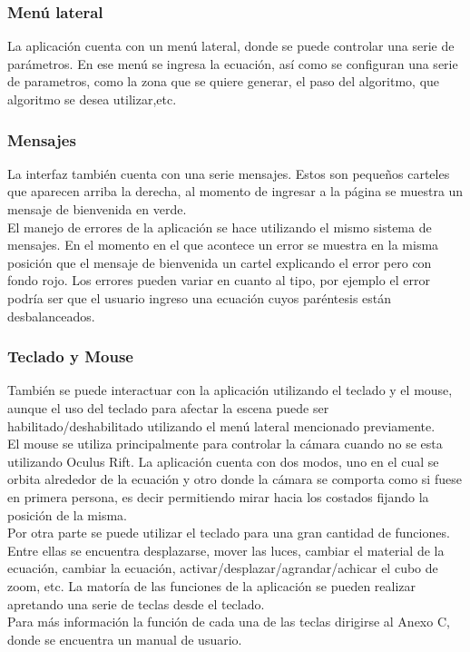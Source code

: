 \documentclass[12pt]{article}
\begin{document}
\subsubsection{Menú lateral}
La aplicación cuenta con un menú lateral, donde se puede controlar una serie de parámetros. En ese menú se ingresa la ecuación, así como se configuran una serie de parametros, como la zona que se quiere generar, el paso del algoritmo, que algoritmo se desea utilizar,etc. 
\subsubsection{Mensajes}
La interfaz también cuenta con una serie mensajes. Estos son pequeños carteles que aparecen arriba la derecha, al momento de ingresar a la página se muestra un mensaje de bienvenida en verde. 
\\El manejo de errores de la aplicación se hace utilizando el mismo sistema de mensajes. En el momento en el que acontece un error se muestra en la misma posición que el mensaje de bienvenida un cartel explicando el error pero con fondo rojo. Los errores pueden variar en cuanto al tipo, por ejemplo el error podría ser que el usuario ingreso una ecuación cuyos paréntesis están desbalanceados.
\subsubsection{Teclado y Mouse}
También se puede interactuar con la aplicación utilizando el teclado y el mouse, aunque el uso del teclado para afectar la escena puede ser habilitado/deshabilitado utilizando el menú lateral mencionado previamente.
\\El mouse se utiliza principalmente para controlar la cámara cuando no se esta utilizando Oculus Rift. La aplicación cuenta con dos modos, uno en el cual se orbita alrededor de la ecuación y otro donde la cámara se comporta como si fuese en primera persona, es decir permitiendo mirar hacia los costados fijando la posición de la misma.
\\Por otra parte se puede utilizar el teclado para una gran cantidad de funciones. Entre ellas se encuentra desplazarse, mover las luces, cambiar el material de la ecuación, cambiar la ecuación, activar/desplazar/agrandar/achicar el cubo de zoom, etc. La matoría de las funciones de la aplicación se pueden realizar apretando una serie de teclas desde el teclado.
\\Para más información la función de cada una de las teclas dirigirse al Anexo C, donde se encuentra un manual de usuario.
\clearpage
\end{document}
